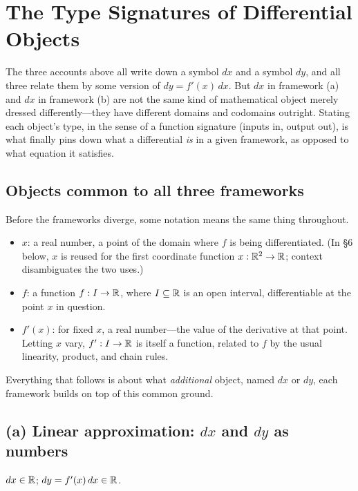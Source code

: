 \documentclass{essay}
\begin{document}
\section{The Type Signatures of Differential Objects}

The three accounts above all write down a symbol \(dx\) and a symbol \(dy\), and all three relate them by some version of \(dy = f'(x)\,dx\). But \(dx\) in framework (a) and \(dx\) in framework (b) are not the same kind of mathematical object merely dressed differently---they have different domains and codomains outright. Stating each object's type, in the sense of a function signature (inputs in, output out), is what finally pins down what a differential \emph{is} in a given framework, as opposed to what equation it satisfies.

\subsection*{Objects common to all three frameworks}

Before the frameworks diverge, some notation means the same thing throughout.

\begin{itemize}[leftmargin=*]
  \item \(x\): a real number, a point of the domain where \(f\) is being differentiated. (In \S6 below, \(x\) is reused for the first coordinate function \(x : \mathbb{R}^{2} \to \mathbb{R}\); context disambiguates the two uses.)
  \item \(f\): a function \(f : I \to \mathbb{R}\), where \(I \subseteq \mathbb{R}\) is an open interval, differentiable at the point \(x\) in question.
  \item \(f'(x)\): for fixed \(x\), a real number---the value of the derivative at that point. Letting \(x\) vary, \(f' : I \to \mathbb{R}\) is itself a function, related to \(f\) by the usual linearity, product, and chain rules.
\end{itemize}

Everything that follows is about what \emph{additional} object, named \(dx\) or \(dy\), each framework builds on top of this common ground.

\subsection*{(a) Linear approximation: \(dx\) and \(dy\) as numbers}

\begin{signature}
  \(dx \in \mathbb{R}\); \quad \(dy = f'(x)\,dx \in \mathbb{R}\).
\end{signature}
\end{document}
